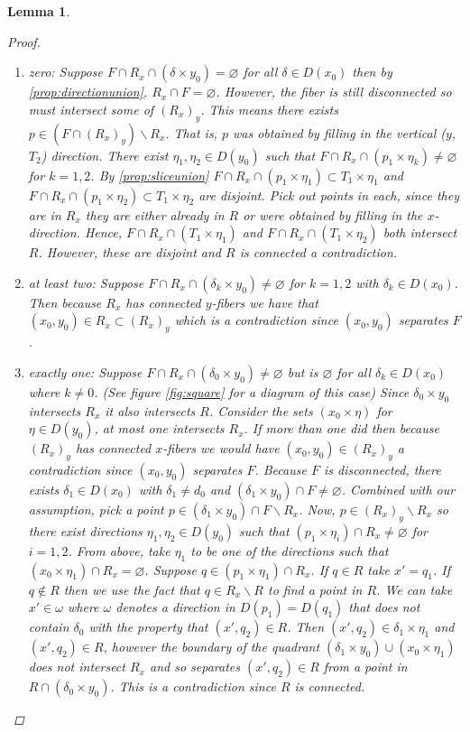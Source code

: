 \documentclass[12pt,parskip=full]{report}
\theoremstyle{plain}
\newtheorem{lem}[thm]{Lemma}
\theoremstyle{definition}
\newcommand{\rxy}{(R_x)_y}
\begin{document}
\begin{lem}
\begin{proof}
        \begin{enumerate}
            \item zero: Suppose \(F\cap R_x \cap (\delta \times y_0)=\varnothing\) for all \(\delta\in D(x_0)\) then by \ref{prop:directionunion}, $R_x \cap F=\varnothing$. However, the fiber is still disconnected so must intersect some of $\rxy$. This means there exists $p\in (F\cap \rxy)\smallsetminus R_x$. That is, $p$ was obtained by filling in the vertical ($y$, $T_2$) direction. There exist $\eta_1, \eta_2\in D(y_0)$ such that $F\cap R_x \cap (p_1 \times \eta_k) \neq \varnothing$ for $k=1,2$. By \ref{prop:sliceunion} \(F\cap R_x \cap (p_1 \times \eta_1)\subset T_1\times \eta_1\) and \(F \cap R_x \cap (p_1 \times \eta_2)\subset T_1\times \eta_2\) are disjoint. Pick out points in each, since they are in $R_x$ they are either already in $R$ or were obtained by filling in the $x$-direction. Hence, $F\cap R_x \cap (T_1\times \eta_1)$ and $F\cap R_x \cap (T_1\times \eta_2)$ both intersect $R$. However, these are disjoint and $R$ is connected a contradiction.
            \item at least two: Suppose \(F\cap R_x\cap(\delta_k \times y_0)\neq\varnothing\) for $k=1,2$ with $\delta_k\in D(x_0)$. Then because $R_x$ has connected $y$-fibers we have that $(x_0,y_0)\in R_x\subset \rxy$ which is a contradiction since $(x_0,y_0)$ separates $F$.
            \item exactly one: Suppose \(F\cap R_x\cap(\delta_0 \times y_0)\neq\varnothing\) but is  $\varnothing$ for all $\delta_k\in D(x_0)$ where $k\neq 0$. (See figure \ref{fig:square} for a diagram of this case) Since $\delta_0\times y_0$ intersects $R_x$ it also intersects $R$. Consider the sets $(x_0\times \eta)$ for $\eta\in D(y_0)$, at most one intersects $R_x$. If more than one did then because $\rxy$ has connected $x$-fibers we would have $(x_0,y_0)\in\rxy$ a contradiction since $(x_0,y_0)$ separates $F$. Because $F$ is disconnected, there exists $\delta_1\in D(x_0)$ with $\delta_1\neq d_0$ and $(\delta_1\times y_0)\cap F\neq \varnothing$. Combined with our assumption, pick a point $p\in (\delta_1\times y_0)\cap F\smallsetminus R_x$. Now, $p\in\rxy\smallsetminus R_x$ so there exist directions $\eta_1,\eta_2\in D(y_0)$ such that $(p_1\times \eta_i)\cap R_x\neq\varnothing$ for $i=1,2$. From above, take $\eta_1$ to be one of the directions such that $(x_0\times \eta_1)\cap R_x =\varnothing$. Suppose $q\in (p_1\times \eta_1)\cap R_x$. If $q\in R$ take $x'=q_1$. If $q\not\in R$ then we use the fact that $q\in R_x\smallsetminus R$ to find a point in $R$. We can take $x'\in \omega$ where $\omega$ denotes a direction in $D(p_1)=D(q_1)$ that does not contain $\delta_0$ with the property that $(x',q_2)\in R$. Then $(x', q_2)\in \delta_1\times \eta_1$ and $(x',q_2)\in R$, however the boundary of the quadrant $(\delta_1\times y_0)\cup (x_0\times \eta_1)$ does not intersect $R_x$ and so separates $(x',q_2)\in R$ from a point in $R\cap (\delta_0\times y_0)$. This is a contradiction since $R$ is connected.

\end{enumerate}
\end{proof}
\end{lem}
\end{document}
